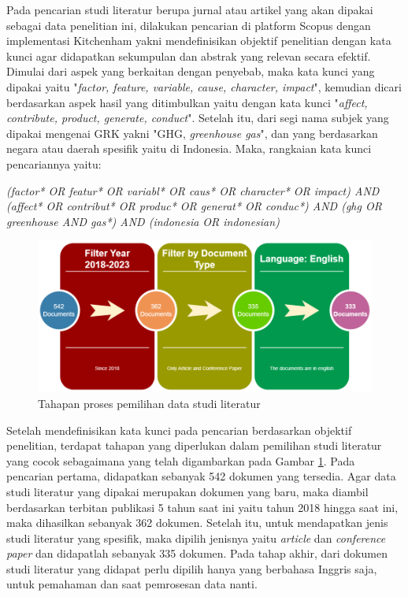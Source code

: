 Pada pencarian studi literatur berupa jurnal atau artikel yang akan dipakai sebagai data penelitian ini, dilakukan pencarian di platform Scopus dengan implementasi Kitchenham yakni mendefinisikan objektif penelitian dengan kata kunci agar didapatkan sekumpulan dan abstrak yang relevan secara efektif. Dimulai dari aspek yang berkaitan dengan penyebab, maka kata kunci yang dipakai yaitu "\textit{factor, feature, variable, cause, character, impact}", kemudian dicari berdasarkan aspek hasil yang ditimbulkan yaitu dengan kata kunci "\textit{affect, contribute, product, generate, conduct}". Setelah itu, dari segi nama subjek yang dipakai mengenai GRK yakni "GHG, \textit{greenhouse gas}", dan yang berdasarkan negara atau daerah spesifik yaitu di Indonesia. Maka, rangkaian kata kunci pencariannya yaitu:
\begin{center}
    \textit{(factor* OR featur* OR variabl* OR caus* OR character* OR impact) AND (affect* OR contribut* OR produc* OR generat* OR conduc*) AND (ghg OR greenhouse AND gas*) AND (indonesia OR indonesian)}
\end{center}

\begin{figure}[!htp]
    \centering
    \includegraphics[width=0.85\linewidth]{img/bab3-21.png}
    \caption{Tahapan proses pemilihan data studi literatur}
    \label{fig:3-21}
\end{figure}

Setelah mendefinisikan kata kunci pada pencarian berdasarkan objektif penelitian, terdapat tahapan yang diperlukan dalam pemilihan studi literatur yang cocok sebagaimana yang telah digambarkan pada Gambar \ref{fig:3-21}. Pada pencarian pertama, didapatkan sebanyak 542 dokumen yang tersedia. Agar data studi literatur yang dipakai merupakan dokumen yang baru, maka diambil berdasarkan terbitan publikasi 5 tahun saat ini yaitu tahun 2018 hingga saat ini, maka dihasilkan sebanyak 362 dokumen. Setelah itu, untuk mendapatkan jenis studi literatur yang spesifik, maka dipilih jenisnya yaitu \textit{article} dan \textit{conference paper} dan didapatlah sebanyak 335 dokumen. Pada tahap akhir, dari dokumen studi literatur yang didapat perlu dipilih hanya yang berbahasa Inggris saja, untuk pemahaman dan saat pemrosesan data nanti. 

